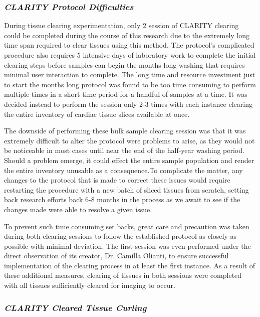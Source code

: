 \subsubsection{\textit{CLARITY Protocol Difficulties}}
During tissue clearing experimentation, only 2 session of CLARITY clearing could be completed during the course of this research due to the extremely long time span required to clear tissues using this method. The protocol's complicated procedure also requires 5 intensive days of laboratory work to complete the initial clearing steps before samples can begin the months long washing that requires minimal user interaction to complete. The long time and resource investment just to start the months long protocol was found to be too time consuming to perform multiple times in a short time period for a handful of samples at a time. It was decided instead to perform the session only 2-3 times with each instance clearing the entire inventory of cardiac tissue slices available at once. 

The downside of performing these bulk sample clearing session was that it was extremely difficult to alter the protocol were problems to arise, as they would not be noticeable in most cases until near the end of the half-year washing period. Should a problem emerge, it could effect the entire sample population and render the entire inventory unusable as a consequence.To complicate the matter, any changes to the protocol that is made to correct these issues would require restarting the procedure with a new batch of sliced tissues from scratch, setting back research efforts back 6-8 months in the process as we await to see if the changes made were able to resolve a given issue. 

To prevent such time consuming set backs, great care and precaution was taken during both clearing sessions to follow the established protocol as closely as possible with minimal deviation. The first session was even performed under the direct observation of its creator, Dr. Camilla Olianti, to ensure successful implementation of the clearing process in at least the first instance. As a result of these additional measures, clearing of tissues in both sessions were completed with all tissues sufficiently cleared for imaging to occur.

\subsubsection{\textit{CLARITY Cleared Tissue Curling}}

